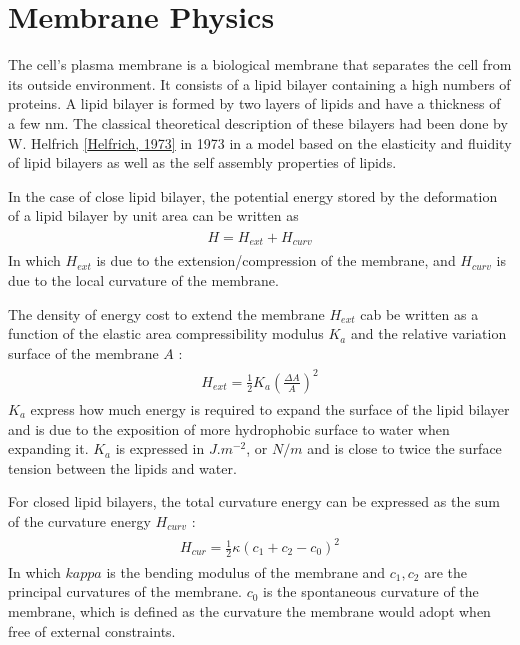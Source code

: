 \documentclass[A4paperpaper,11pt,english]{sphinxmanual}
\begin{document}
\section{Membrane Physics}
\label{index-latex:membrane-physics}
The cell's plasma membrane is a biological membrane that separates the cell from
its outside environment.  It consists of a lipid bilayer containing
a high numbers of proteins.  A lipid bilayer is formed by two layers of lipids and have a
thickness of a few nm. The classical theoretical description
of these bilayers had been done by W. Helfrich {\hyperref[index-latex:helfrich]{{[}Helfrich,  1973{]}}} in 1973 in a
model based on the elasticity and fluidity of lipid bilayers as well as the
self assembly properties of  lipids.

In the case of close lipid bilayer, the potential energy stored by the
deformation of a lipid bilayer by unit area can be  written as
\label{index-latex:equation-eqa1}\begin{gather}
\begin{split}H = H_{ext} + H_{curv}\end{split}\label{index-latex-eqa1}
\end{gather}
In which \(H_{ext}\) is due to the extension/compression of the membrane,
and \(H_{curv}\) is due to the local curvature of the membrane.

The density of energy cost to extend the membrane \(H_{ext}\) cab be written as a
function  of the elastic area compressibility modulus \(K_a\) and the
relative variation surface of the membrane \(A\) :
\label{index-latex:equation-eqa2}\begin{gather}
\begin{split}H_{ext} = \frac 1 2 K_a \left(\frac{\Delta A}{A}\right)^2\end{split}\label{index-latex-eqa2}
\end{gather}
\(K_a\) express how much energy is required to expand the surface of the
lipid bilayer and is due to the exposition of more hydrophobic surface to water
when expanding it. \(K_a\) is expressed in \(J.m^{-2}\), or \(N/m\)
and is close to twice the surface tension between the lipids and water.

For closed lipid bilayers, the total curvature energy can be expressed as the
sum of the curvature energy \(H_{curv}\) :
\label{index-latex:equation-eqa3}\begin{gather}
\begin{split}H_{cur} = \frac 1 2 \kappa (c_1 + c_2 -c_0)^2\end{split}\label{index-latex-eqa3}
\end{gather}
In which \(kappa\) is the bending modulus of the membrane and \(c_1,c_2\)
are the principal curvatures of the membrane. \(c_0\) is the spontaneous
curvature of the membrane, which is defined as the curvature the membrane would adopt when free of
external constraints.
\end{document}
